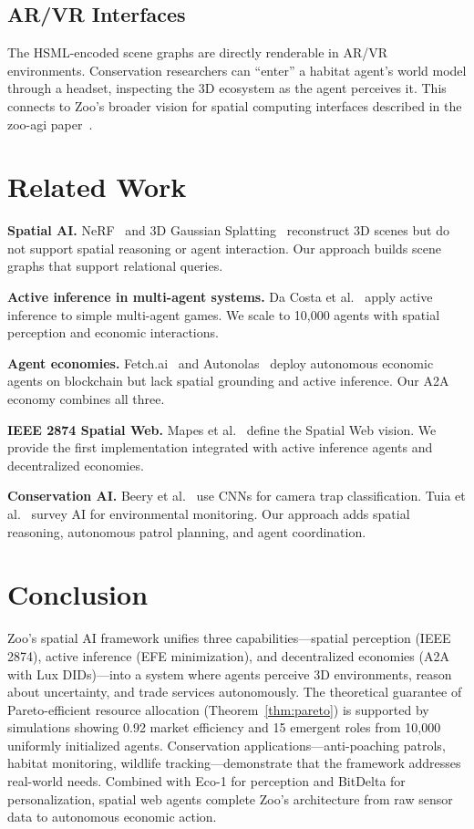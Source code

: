 \documentclass[11pt,letterpaper]{article}
\begin{document}
\subsection{AR/VR Interfaces}

The HSML-encoded scene graphs are directly renderable in AR/VR environments. Conservation researchers can ``enter'' a habitat agent's world model through a headset, inspecting the 3D ecosystem as the agent perceives it. This connects to Zoo's broader vision for spatial computing interfaces described in the zoo-agi paper~\cite{zoo_agi}.

\section{Related Work}

\textbf{Spatial AI.} NeRF~\cite{mildenhall2021nerf} and 3D Gaussian Splatting~\cite{kerbl20233d} reconstruct 3D scenes but do not support spatial reasoning or agent interaction. Our approach builds scene graphs that support relational queries.

\textbf{Active inference in multi-agent systems.} Da Costa et al.~\cite{dacosta2020active} apply active inference to simple multi-agent games. We scale to 10,000 agents with spatial perception and economic interactions.

\textbf{Agent economies.} Fetch.ai~\cite{fetchai2019} and Autonolas~\cite{autonolas2023} deploy autonomous economic agents on blockchain but lack spatial grounding and active inference. Our A2A economy combines all three.

\textbf{IEEE 2874 Spatial Web.} Mapes et al.~\cite{mapes2019spatial} define the Spatial Web vision. We provide the first implementation integrated with active inference agents and decentralized economies.

\textbf{Conservation AI.} Beery et al.~\cite{beery2019efficient} use CNNs for camera trap classification. Tuia et al.~\cite{tuia2022perspectives} survey AI for environmental monitoring. Our approach adds spatial reasoning, autonomous patrol planning, and agent coordination.

\section{Conclusion}

Zoo's spatial AI framework unifies three capabilities---spatial perception (IEEE 2874), active inference (EFE minimization), and decentralized economies (A2A with Lux DIDs)---into a system where agents perceive 3D environments, reason about uncertainty, and trade services autonomously. The theoretical guarantee of Pareto-efficient resource allocation (Theorem~\ref{thm:pareto}) is supported by simulations showing 0.92 market efficiency and 15 emergent roles from 10,000 uniformly initialized agents. Conservation applications---anti-poaching patrols, habitat monitoring, wildlife tracking---demonstrate that the framework addresses real-world needs. Combined with Eco-1 for perception and BitDelta for personalization, spatial web agents complete Zoo's architecture from raw sensor data to autonomous economic action.
\end{document}
